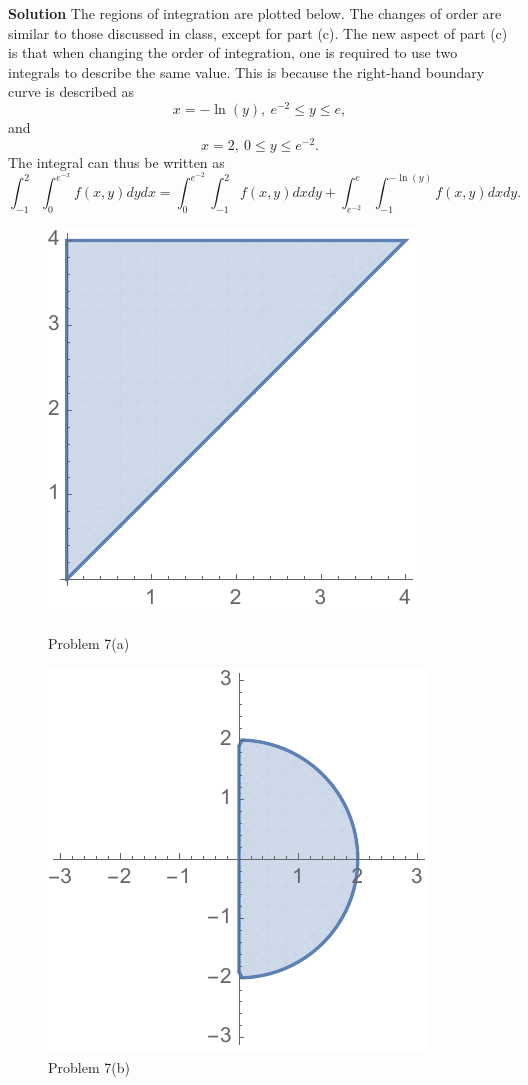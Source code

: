\documentclass[12pt,oneside]{exam}
\newenvironment{newsolution}{\vspace{.1in}\noindent\textbf{Solution \hspace{.05em}}}{}
\begin{document}
\begin{newsolution}
The regions of integration are plotted below. The changes of order are similar to those discussed in class, except for part (c). The new aspect of part (c) is that when changing the order of integration, one is required to use two integrals to describe the same value. This is because the right-hand boundary curve is described as 
\begin{equation*}
x= - \ln(y), \ e^{-2} \leq y \leq e, 
\end{equation*}
and 
\begin{equation*}
x=2, \ 0 \leq y \leq e^{-2}.
\end{equation*}
The integral can thus be written as 
\begin{equation*}
\int_{-1}^{2} \int_{0}^{e^{-x}} f(x,y) dy dx = \int_{0}^{e^{-2}} \int_{-1}^{2} f(x,y) dx dy + \int_{e^{-2}}^{e} \int_{-1}^{-\ln(y)} f(x,y) dx dy.
\end{equation*}

\begin{figure}[h]
\centering
\begin{minipage}{.5\textwidth}
  \centering
  \includegraphics[width=.4\linewidth]{hw3_plot7a}
  \caption{Problem 7(a)}
\end{minipage}%
\begin{minipage}{.5\textwidth}
  \centering
  \includegraphics[width=.4\linewidth]{hw3_plot7b}
  \caption{Problem 7(b)}
\end{minipage}
\end{figure}


\end{newsolution}
\end{document}
